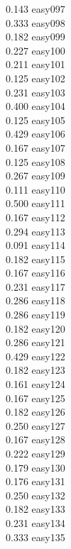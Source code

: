 \documentclass[10pt]{article}
\begin{document}
\begin{enumerate}
\begin{enumerate}
\begin{multicols}{5}
            0.143 easy097\\
            0.333 easy098\\
            0.182 easy099\\
            0.227 easy100\\
            0.211 easy101\\
            0.125 easy102\\
            0.231 easy103\\
            0.400 easy104\\
            0.125 easy105\\
            0.429 easy106\\
            0.167 easy107\\
            0.125 easy108\\
            0.267 easy109\\
            0.111 easy110\\
            0.500 easy111\\
            0.167 easy112\\
            0.294 easy113\\
            0.091 easy114\\
            0.182 easy115\\
            0.167 easy116\\
            0.231 easy117\\
            0.286 easy118\\
            0.286 easy119\\
            0.182 easy120\\
            0.286 easy121\\
            0.429 easy122\\
            0.182 easy123\\
            0.161 easy124\\
            0.167 easy125\\
            0.182 easy126\\
            0.250 easy127\\
            0.167 easy128\\
            0.222 easy129\\
            0.179 easy130\\
            0.176 easy131\\
            0.250 easy132\\
            0.182 easy133\\
            0.231 easy134\\
            0.333 easy135\\

\end{multicols}
\end{enumerate}
\end{enumerate}
\end{document}
